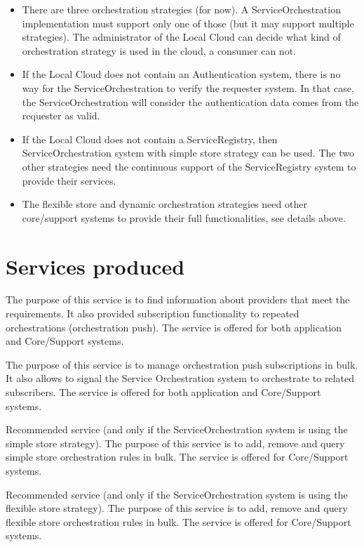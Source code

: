 \documentclass[a4paper]{arrowhead}
\begin{document}
\begin{itemize}
    \item There are three orchestration strategies (for now). A ServiceOrchestration implementation must support only one of those (but it may support multiple strategies). The administrator of the Local Cloud can decide what kind of orchestration strategy is used in the cloud, a consumer can not.
    \item If the Local Cloud does not contain an Authentication system, there is no way for the ServiceOrchestration to verify the requester system. In that case, the ServiceOrchestration will consider the authentication data comes from the requester as valid.
    \item If the Local Cloud does not contain a ServiceRegistry, then ServiceOrchestration system with simple store strategy can be used. The two other strategies need the continuous support of the ServiceRegistry system to provide their services.
    \item The flexible store and dynamic orchestration strategies need other core/support systems to provide their full functionalities, see details above.
\end{itemize} 

\newpage

\section{Services produced}
\label{sec:services}

The purpose of this service is to find information about providers that meet the requirements. It also provided subscription functionality to repeated orchestrations (orchestration push). The service is offered for both application and Core/Support systems. 

The purpose of this service is to manage orchestration push subscriptions in bulk. It also allows to signal the Service Orchestration system to orchestrate to related subscribers. The service is offered for both application and Core/Support systems. 

Recommended service (and only if the ServiceOrchestration system is using the simple store strategy). The purpose of this service is to add, remove and query simple store orchestration rules in bulk. The service is offered for Core/Support systems.

Recommended service (and only if the ServiceOrchestration system is using the flexible store strategy). The purpose of this service is to add, remove and query flexible store orchestration rules in bulk. The service is offered for Core/Support systems.
\end{document}
